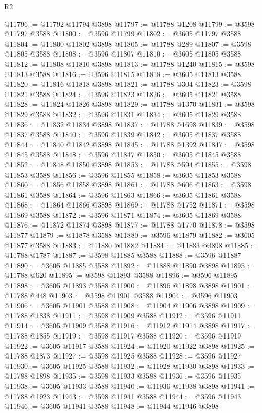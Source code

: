 \begin{lexlean}{R2}
\begin{coremodule}
@11796 := @11792 @11794 @3898
@11797 := @11788 @1208
@11799 := @3598 @11797 @3588
@11800 := @3596 @11799
@11802 := @3605 @11797 @3588
@11804 := @11800 @11802 @3898
@11805 := @11788 @289
@11807 := @3598 @11805 @3588
@11808 := @3596 @11807
@11810 := @3605 @11805 @3588
@11812 := @11808 @11810 @3898
@11813 := @11788 @1240
@11815 := @3598 @11813 @3588
@11816 := @3596 @11815
@11818 := @3605 @11813 @3588
@11820 := @11816 @11818 @3898
@11821 := @11788 @304
@11823 := @3598 @11821 @3588
@11824 := @3596 @11823
@11826 := @3605 @11821 @3588
@11828 := @11824 @11826 @3898
@11829 := @11788 @1370
@11831 := @3598 @11829 @3588
@11832 := @3596 @11831
@11834 := @3605 @11829 @3588
@11836 := @11832 @11834 @3898
@11837 := @11788 @1698
@11839 := @3598 @11837 @3588
@11840 := @3596 @11839
@11842 := @3605 @11837 @3588
@11844 := @11840 @11842 @3898
@11845 := @11788 @1392
@11847 := @3598 @11845 @3588
@11848 := @3596 @11847
@11850 := @3605 @11845 @3588
@11852 := @11848 @11850 @3898
@11853 := @11788 @594
@11855 := @3598 @11853 @3588
@11856 := @3596 @11855
@11858 := @3605 @11853 @3588
@11860 := @11856 @11858 @3898
@11861 := @11788 @606
@11863 := @3598 @11861 @3588
@11864 := @3596 @11863
@11866 := @3605 @11861 @3588
@11868 := @11864 @11866 @3898
@11869 := @11788 @1752
@11871 := @3598 @11869 @3588
@11872 := @3596 @11871
@11874 := @3605 @11869 @3588
@11876 := @11872 @11874 @3898
@11877 := @11788 @1770
@11878 := @3598 @11877
@11879 := @11878 @3588
@11880 := @3596 @11879
@11882 := @3605 @11877 @3588
@11883 := @11880 @11882
@11884 := @11883 @3898
@11885 := @11788 @1787
@11887 := @3598 @11885 @3588
@11888 := @3596 @11887
@11890 := @3605 @11885 @3588
@11892 := @11888 @11890 @3898
@11893 := @11788 @620
@11895 := @3598 @11893 @3588
@11896 := @3596 @11895
@11898 := @3605 @11893 @3588
@11900 := @11896 @11898 @3898
@11901 := @11788 @448
@11903 := @3598 @11901 @3588
@11904 := @3596 @11903
@11906 := @3605 @11901 @3588
@11908 := @11904 @11906 @3898
@11909 := @11788 @1838
@11911 := @3598 @11909 @3588
@11912 := @3596 @11911
@11914 := @3605 @11909 @3588
@11916 := @11912 @11914 @3898
@11917 := @11788 @1855
@11919 := @3598 @11917 @3588
@11920 := @3596 @11919
@11922 := @3605 @11917 @3588
@11924 := @11920 @11922 @3898
@11925 := @11788 @1873
@11927 := @3598 @11925 @3588
@11928 := @3596 @11927
@11930 := @3605 @11925 @3588
@11932 := @11928 @11930 @3898
@11933 := @11788 @1898
@11935 := @3598 @11933 @3588
@11936 := @3596 @11935
@11938 := @3605 @11933 @3588
@11940 := @11936 @11938 @3898
@11941 := @11788 @1923
@11943 := @3598 @11941 @3588
@11944 := @3596 @11943
@11946 := @3605 @11941 @3588
@11948 := @11944 @11946 @3898

\end{coremodule}
\end{lexlean}
